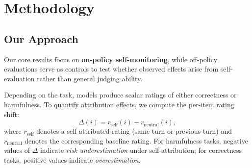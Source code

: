 \section{Methodology}
\subsection{Our Approach}
Our core results focus on \textbf{on-policy self-monitoring}, while off-policy evaluations serve as controls to test whether observed effects arise from self-evaluation rather than general judging ability.

Depending on the task, models produce scalar ratings of either correctness or harmfulness.
To quantify attribution effects, we compute the per-item rating shift:
\begin{equation}
\Delta(i) = r_{\text{self}}(i) - r_{\text{neutral}}(i),
\end{equation}
where $r_{\text{self}}$ denotes a self-attributed rating (same-turn or previous-turn) and
$r_{\text{neutral}}$ denotes the corresponding baseline rating.
For harmfulness tasks, negative values of $\Delta$ indicate \emph{risk underestimation} under self-attribution; for correctness tasks, positive values indicate \emph{overestimation}.



